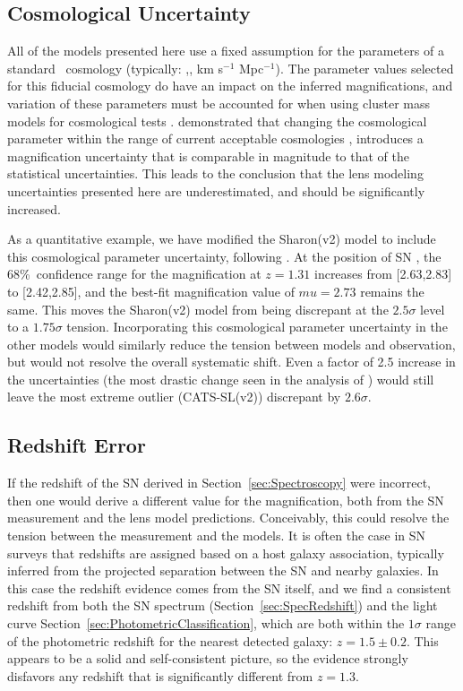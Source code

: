 \subsection{Cosmological Uncertainty}

All of the models presented here use a fixed assumption for the
parameters of a standard \LCDM\ cosmology (typically: ,, km
s$^{-1}$ Mpc$^{-1}$).  The parameter values selected for this fiducial
cosmology do have an impact on the inferred magnifications, and
variation of these parameters must be accounted for when using cluster
mass models for cosmological tests \citep{Zitrin:2014b}. 
\citep{Bayliss:2015} demonstrated that
changing the cosmological parameter within the range of current
acceptable cosmologies \citep[e.g.][]{Hinshaw:2013,Planck:2015},
introduces a magnification uncertainty that is comparable in magnitude
to that of the statistical uncertainties.  This leads to the
conclusion that the lens modeling uncertainties presented here are
underestimated, and should be significantly increased. 

As a quantitative example, we have modified the Sharon(v2) model to
include this cosmological parameter uncertainty,
following \citep{Bayliss:2015}. At the position of SN \tomas, the
68\%\ confidence range for the magnification at $z=1.31$ increases
from [2.63,2.83] to [2.42,2.85], and the best-fit magnification value
of $mu=2.73$ remains the same.  This moves the Sharon(v2) model from
being discrepant at the $2.5\sigma$ level to a $1.75\sigma$ tension.
Incorporating this cosmological parameter uncertainty in the other
models would similarly reduce the tension between models and
observation, but would not resolve the overall systematic shift.  Even
a factor of 2.5 increase in the uncertainties (the most drastic change
seen in the analysis of \citep{Bayliss:2015}) would still leave the
most extreme outlier (CATS-SL(v2)) discrepant by $2.6\sigma$.

\subsection{Redshift Error}
\label{sec:RedshiftError}

If the redshift of the SN derived in Section~\ref{sec:Spectroscopy}
were incorrect, then one would derive a different value for the
magnification, both from the SN measurement and the lens model
predictions.  Conceivably, this could resolve the tension between the
measurement and the models.  It is often the case in SN surveys that
redshifts are assigned based on a host galaxy association, typically
inferred from the projected separation between the SN and nearby
galaxies.  In this case the redshift evidence comes from the SN
itself, and we find a consistent redshift from both the SN spectrum
(Section~\ref{sec:SpecRedshift}) and the light curve
Section~\ref{sec:PhotometricClassification}, which are both within the
$1\sigma$ range of the photometric redshift for the nearest detected
galaxy: $z=1.5\pm0.2$. This appears to be a solid and self-consistent
picture, so the evidence strongly disfavors any redshift that is
significantly different from $z=1.3$.

